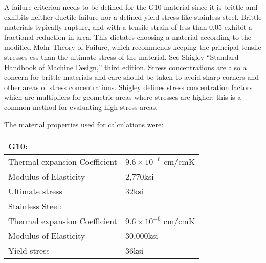 
A failure criterion needs to be defined for the G10 material since it is brittle and exhibits neither ductile failure nor a defined yield stress like stainless steel.  Brittle materials typically rupture, and with a tensile strain of less than 0.05 exhibit a fractional reduction in area.  This dictates choosing a material according to 
the modified Mohr Theory of Failure, which recommends keeping the principal tensile stresses ess than the ultimate stress of the material.  See Shigley ``Standard Handbook of Machine Design,'' third edition.   Stress concentrations are also a concern for brittle materials and care should be taken to avoid sharp corners and other areas of stress concentrations.  Shigley defines stress concentration factors which are multipliers for geometric areas where stresses are higher; this is a common method for evaluating high stress areas.  


The material properties used for calculations were:

\begin{tabular}{l l}
G10: 	& \\
\hline
Thermal expansion Coefficient	&	$9.6 \times 10^{-6}$ cm/cmK	\\
Modulus of Elasticity			&	2,770ksi				\\
\vspace{0.5em}Ultimate stress				&	32ksi				\\
Stainless Steel: & \\
\hline
Thermal expansion Coefficient	&	$9.6 \times 10^{-6}$ cm/cmK	\\
Modulus of Elasticity			&	30,000ksi				\\
Yield stress					&	36ksi				\\
\end{tabular}


